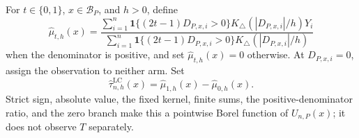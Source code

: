 For \(t\in\{0,1\}\), \(x\in\mathcal B_P\), and \(h>0\), define
\[
 \widehat\mu_{t,h}(x)=
 \frac{\sum_{i=1}^n\mathbf1\{(2t-1)D_{P,x,i}>0\}
 K_\triangle(|D_{P,x,i}|/h)Y_i}
 {\sum_{i=1}^n\mathbf1\{(2t-1)D_{P,x,i}>0\}
 K_\triangle(|D_{P,x,i}|/h)}
\]
when the denominator is positive, and set \(\widehat\mu_{t,h}(x)=0\) otherwise.  At \(D_{P,x,i}=0\), assign the observation to neither arm.  Set
\[
 \widehat\tau^{\mathrm{LC}}_{n,h}(x)=\widehat\mu_{1,h}(x)-\widehat\mu_{0,h}(x).
\]
Strict sign, absolute value, the fixed kernel, finite sums, the positive-denominator ratio, and the zero branch make this a pointwise Borel function of \(U_{n,P}(x)\); it does not observe \(T\) separately.